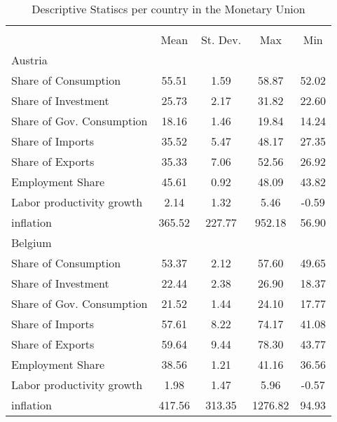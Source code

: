 {
\def\sym#1{\ifmmode^{#1}\else\(^{#1}\)\fi}
\begin{longtable}{l*{1}{cccc}}
\caption{Descriptive Statiscs per country in the Monetary Union}\\
\hline\hline\endfirsthead\hline\endhead\hline\endfoot\endlastfoot
                    &\multicolumn{4}{c}{}                               \\
                    &        Mean&    St. Dev.&         Max&         Min\\
\hline
Austria             &            &            &            &            \\
Share of Consumption&       55.51&        1.59&       58.87&       52.02\\
Share of Investment &       25.73&        2.17&       31.82&       22.60\\
Share of Gov. Consumption&       18.16&        1.46&       19.84&       14.24\\
Share of Imports    &       35.52&        5.47&       48.17&       27.35\\
Share of Exports    &       35.33&        7.06&       52.56&       26.92\\
Employment Share    &       45.61&        0.92&       48.09&       43.82\\
Labor productivity growth&        2.14&        1.32&        5.46&       -0.59\\
inflation           &      365.52&      227.77&      952.18&       56.90\\
Belgium             &            &            &            &            \\
Share of Consumption&       53.37&        2.12&       57.60&       49.65\\
Share of Investment &       22.44&        2.38&       26.90&       18.37\\
Share of Gov. Consumption&       21.52&        1.44&       24.10&       17.77\\
Share of Imports    &       57.61&        8.22&       74.17&       41.08\\
Share of Exports    &       59.64&        9.44&       78.30&       43.77\\
Employment Share    &       38.56&        1.21&       41.16&       36.56\\
Labor productivity growth&        1.98&        1.47&        5.96&       -0.57\\
inflation           &      417.56&      313.35&     1276.82&       94.93\\

\end{longtable}}
